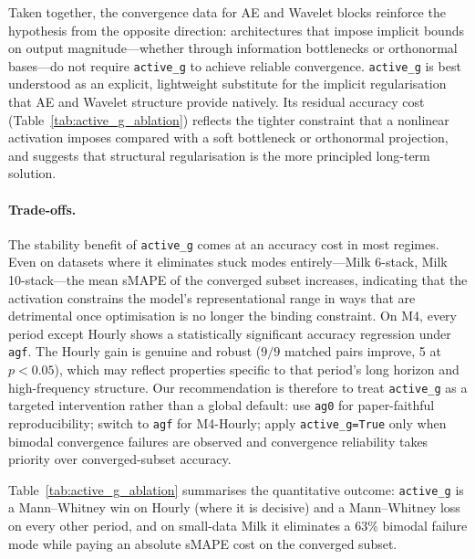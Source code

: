 \documentclass[11pt,a4paper]{article}
\begin{document}
Taken together, the convergence data for AE and Wavelet blocks reinforce the hypothesis from the opposite direction: architectures that impose implicit bounds on output magnitude---whether through information bottlenecks or orthonormal bases---do not require \texttt{active\_g} to achieve reliable convergence. \texttt{active\_g} is best understood as an explicit, lightweight substitute for the implicit regularisation that AE and Wavelet structure provide natively. Its residual accuracy cost (Table~\ref{tab:active_g_ablation}) reflects the tighter constraint that a nonlinear activation imposes compared with a soft bottleneck or orthonormal projection, and suggests that structural regularisation is the more principled long-term solution.

\paragraph{Trade-offs.}
The stability benefit of \texttt{active\_g} comes at an accuracy cost in most regimes. Even on datasets where it eliminates stuck modes entirely---Milk 6-stack, Milk 10-stack---the mean sMAPE of the converged subset increases, indicating that the activation constrains the model's representational range in ways that are detrimental once optimisation is no longer the binding constraint. On M4, every period except Hourly shows a statistically significant accuracy regression under \texttt{agf}. The Hourly gain is genuine and robust ($9/9$ matched pairs improve, 5 at $p < 0.05$), which may reflect properties specific to that period's long horizon and high-frequency structure. Our recommendation is therefore to treat \texttt{active\_g} as a targeted intervention rather than a global default: use \texttt{ag0} for paper-faithful reproducibility; switch to \texttt{agf} for M4-Hourly; apply \texttt{active\_g=True} only when bimodal convergence failures are observed and convergence reliability takes priority over converged-subset accuracy.

Table~\ref{tab:active_g_ablation} summarises the quantitative outcome: \texttt{active\_g} is a Mann--Whitney win on Hourly (where it is decisive) and a Mann--Whitney loss on every other period, and on small-data Milk it eliminates a 63\% bimodal failure mode while paying an absolute sMAPE cost on the converged subset.
\end{document}
